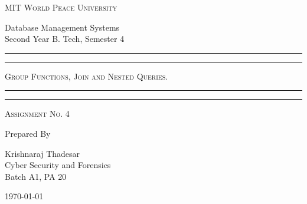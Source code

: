 \documentclass[11pt]{article}
\begin{document}
\begin{titlepage}
	\centering


	\huge\textsc{
		MIT World Peace University
	}\\

	\vspace{0.75\baselineskip} %

	\LARGE{
		Database Management Systems\\
		Second Year B. Tech, Semester 4
	}

	\vfill %


	\rule{\textwidth}{1.6pt}\vspace*{-\baselineskip}\vspace*{2pt}
	\rule{\textwidth}{0.6pt}
	\vspace{0.75\baselineskip} %



	\huge{\textsc{
			Group Functions, Join and Nested Queries.
		}} \\



	\vspace{0.5\baselineskip} %
	\rule{\textwidth}{0.6pt}\vspace*{-\baselineskip}\vspace*{2.8pt}
	\rule{\textwidth}{1.6pt}

	\vspace{1\baselineskip} %


	\LARGE\textsc{
		Assignment No. 4
	} %
	\vfill


	Prepared By
	\vspace{0.5\baselineskip} %

	\Large{
		Krishnaraj Thadesar \\
		Cyber Security and Forensics\\
		Batch A1, PA 20
	}


	\vspace{0.5\baselineskip} %
	\today

\end{titlepage}
\end{document}

